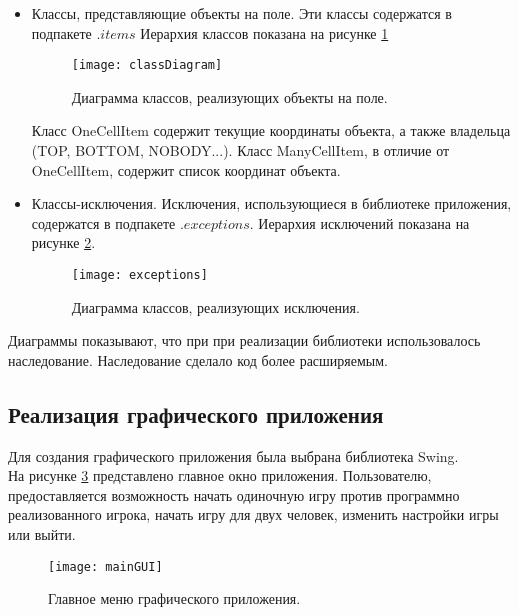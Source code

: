 \documentclass[a4paper]{article}
\begin{document}
\begin{itemize}
\item Классы, представляющие объекты на поле. Эти классы содержатся в подпакете $.items$ Иерархия классов показана на рисунке \ref{pic:classDiagram} 
\begin{figure}[H]
	\begin{center}
		\texttt{[image: classDiagram]}
		\caption{Диаграмма классов, реализующих объекты на поле.} 
		\label{pic:classDiagram} %
	\end{center}
\end{figure}
Класс OneCellItem содержит текущие координаты объекта, а также владельца (TOP, BOTTOM, NOBODY...). Класс ManyCellItem, в отличие от OneCellItem, содержит список координат объекта. 

\item Классы-исключения. Исключения, использующиеся в библиотеке приложения, содержатся в подпакете $.exceptions$. Иерархия исключений показана на рисунке \ref{pic:classDiagram1}.
\begin{figure}[H]
	\begin{center}
		\texttt{[image: exceptions]}
		\caption{Диаграмма классов, реализующих исключения.} 
		\label{pic:classDiagram1} %
	\end{center}
\end{figure}
\end{itemize}
Диаграммы показывают, что при при реализации библиотеки использовалось наследование. Наследование сделало код более расширяемым.
\subsection{Реализация графического приложения}
Для создания графического приложения была выбрана библиотека Swing. \\

На рисунке \ref{pic:mainGUI} представлено главное окно приложения. Пользователю, предоставляется возможность начать одиночную игру против программно реализованного игрока, начать игру для двух человек, изменить настройки игры или выйти. 

\begin{figure}[H]
	\begin{center}
		\texttt{[image: mainGUI]}
		\caption{Главное меню графического приложения.} 
		\label{pic:mainGUI} %
	\end{center}
\end{figure}
\end{document}
